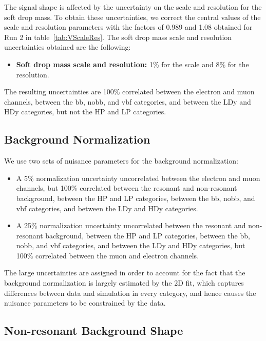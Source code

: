 The \MJ signal shape is affected by the uncertainty on the scale and resolution for the soft drop mass.
To obtain these uncertainties, we correct the central values of the \MJ scale and resolution parameters with the factors of 0.989 and 1.08 obtained for Run 2 in table~\ref{tab:VScaleRes}.
The soft drop mass scale and resolution uncertainties obtained are the following:
\begin{itemize}
  \item {\bfseries Soft drop mass scale and resolution:} 1\% for the scale and 8\% for the resolution.
\end{itemize}
The resulting uncertainties are 100\% correlated between the electron and muon channels, between the bb, nobb, and vbf categories, and between the LDy and HDy categories, but not the HP and LP categories.

\subsection{Background Normalization}

We use two sets of nuisance parameters for the background normalization:
\begin{itemize}
  \item A 5\% normalization uncertainty uncorrelated between the electron and muon channels, but 100\% correlated between the resonant and non-resonant background, between the HP and LP categories, between the bb, nobb, and vbf categories, and between the LDy and HDy categories.
  \item A 25\% normalization uncertainty uncorrelated between the resonant and non-resonant background, between the HP and LP categories, between the bb, nobb, and vbf categories, and between the LDy and HDy categories, but 100\% correlated between the muon and electron channels.
\end{itemize}
The large uncertainties are assigned in order to account for the fact that the background normalization is largely estimated by the 2D fit, which captures differences between data and simulation in every category, and hence causes the nuisance parameters to be constrained by the data.

\subsection{Non-resonant Background Shape}

